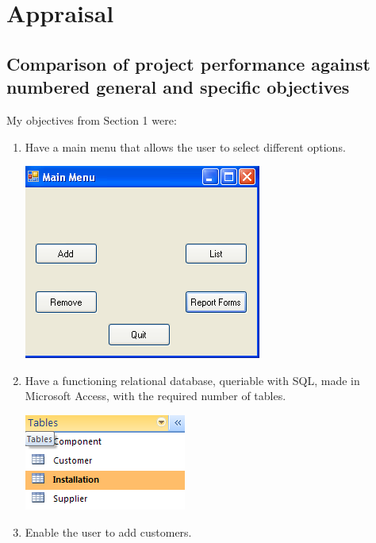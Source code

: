\chapter{Appraisal}
	
	\section{Comparison of project performance against numbered general
and specific objectives}

My objectives from Section 1 were:

\begin{enumerate}
			\item{Have a main menu that allows the user to
select different options.}

\includegraphics[scale=0.5]{frmMainMenu_scrot}
			\item{Have a functioning relational database,
queriable with SQL, made in Microsoft Access, with the required number of
tables.}

\includegraphics[scale=0.5]{dbtablesscrot_scrot}
			\item{Enable the user to add customers.}
			

\end{enumerate}
